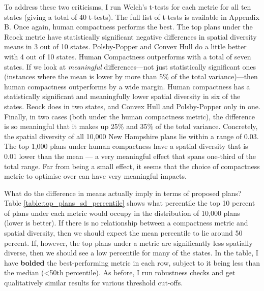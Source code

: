 \documentclass[]{article}
\begin{document}
To address these two criticisms, I run Welch's t-tests for each metric
for all ten states (giving a total of 40 t-tests). The full list of
t-tests is available in Appendix B. Once again, human compactness
performs the best. The top plans under the Reock metric have
statistically significant negative differences in spatial diversity
means in 3 out of 10 states. Polsby-Popper and Convex Hull do a little
better with 4 out of 10 states. Human Compactness outperforms with a
total of seven states. If we look at \emph{meaningful} differences---not
just statistically significant ones (instances where the mean is lower
by more than 5\% of the total variance)---then human compactness
outperforms by a wide margin. Human compactness has a statistically
significant and meaningfully lower spatial diversity in six of the
states. Reock does in two states, and Convex Hull and Polsby-Popper only
in one. Finally, in two cases (both under the human compactness metric),
the difference is so meaningful that it makes up 25\% and 35\% of the
total variance. Concretely, the spatial diversity of all 10,000 New
Hampshire plans lie within a range of 0.03. The top 1,000 plans under
human compactness have a spatial diversity that is 0.01 lower than the
mean --- a very meaningful effect that spans one-third of the total
range. Far from being a small effect, it seems that the choice of
compactness metric to optimise over can have very meaningful impacts.

What do the difference in means actually imply in terms of proposed
plans? Table \ref{table:top_plans_sd_percentile} shows what percentile
the top 10 percent of plans under each metric would occupy in the
distribution of 10,000 plans (lower is better). If there is no
relationship between a compactness metric and spatial diversity, then we
should expect the mean percentile to lie around 50 percent. If, however,
the top plans under a metric are significantly less spatially diverse,
then we should see a low percentile for many of the states. In the
table, I have \textbf{bolded} the best-performing metric in each row,
subject to it being less than the median (\textless{}50th percentile).
As before, I run robustness checks and get qualitatively similar results
for various threshold cut-offs.
\end{document}
